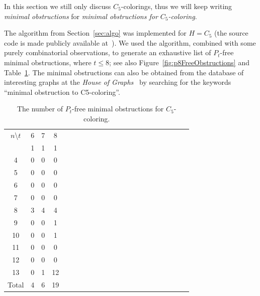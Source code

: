 \documentclass[11pt,a4paper]{article}
\theoremstyle{mystyle}
\begin{document}
In this section we still only discuss $C_5$-colorings, thus we will keep writing \emph{minimal obstructions} for \emph{minimal obstructions for $C_5$-coloring}.

The algorithm from Section~\ref{sec:algo} was implemented for $H=C_5$ (the source code is made publicly available at~\cite{gitrepo}). We used the algorithm, combined with some purely combinatorial observations, to generate an exhaustive list of $P_t$-free minimal obstructions, where $t \leq 8$; see also Figure~\ref{fig:p8FreeObstructions} and Table~\ref{tab:countsOfObstructions}.
The minimal obstructions can also be obtained from the database of interesting graphs at the \textit{House of Graphs}~\cite{DBLP:journals/dam/CoolsaetDG23} by searching for the keywords ``minimal obstruction to C5-coloring''.

\begin{table}[h!] \centering
	\begin{threeparttable}
		\begin{tabular}{cccccccccccccccccccccc} \\
			\hline
			\noalign{\smallskip}
			$n$\textbackslash$t$ & 6 & 7 & 8\\
			\noalign{\smallskip}
			\hline
			\noalign{\smallskip}
			\multicolumn{1}{c}{3} & 1 & 1 & 1\\
			\multicolumn{1}{c}{4} & 0 & 0 & 0\\
			\multicolumn{1}{c}{5} & 0 & 0 & 0\\
			\multicolumn{1}{c}{6} & 0 & 0 & 0\\
			\multicolumn{1}{c}{7} & 0 & 0 & 0\\
			\multicolumn{1}{c}{8} & 3 & 4 & 4\\
			\multicolumn{1}{c}{9} & 0 & 0 & 1\\
			\multicolumn{1}{c}{10} & 0 & 0 & 1\\
			\multicolumn{1}{c}{11} & 0 & 0 & 0\\
			\multicolumn{1}{c}{12} & 0 & 0 & 0\\
			\multicolumn{1}{c}{13} & 0 & 1 & 12\\
			\hline
			\multicolumn{1}{c}{Total} & 4 & 6 & 19\\
			\hline
		\end{tabular}
	\end{threeparttable}
	\caption{The number of $P_t$-free minimal obstructions for $C_5$-coloring.}	
		\label{tab:countsOfObstructions}
\end{table}
\end{document}

